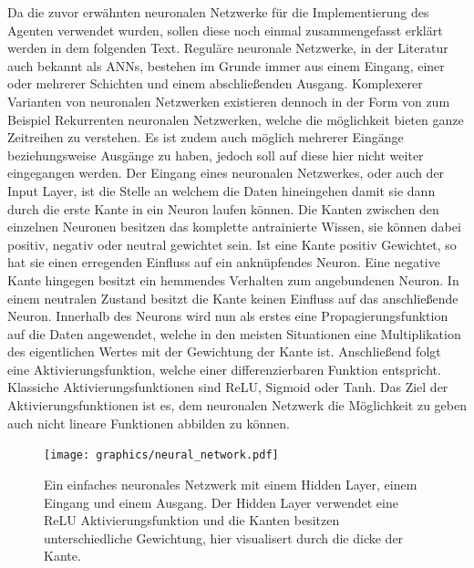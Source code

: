 \documentclass[]{iat}
\begin{document}
Da die zuvor erwähnten neuronalen Netzwerke für die Implementierung des Agenten verwendet wurden, sollen diese noch einmal zusammengefasst erklärt werden in dem folgenden Text. Reguläre neuronale Netzwerke, in der Literatur auch bekannt als ANNs, bestehen im Grunde immer aus einem Eingang, einer oder mehrerer Schichten und einem abschließenden Ausgang. Komplexerer Varianten von neuronalen Netzwerken existieren dennoch in der Form von zum Beispiel Rekurrenten neuronalen Netzwerken, welche die möglichkeit bieten ganze Zeitreihen zu verstehen. Es ist zudem auch möglich mehrerer Eingänge beziehungsweise Ausgänge zu haben, jedoch soll auf diese hier nicht weiter eingegangen werden. Der Eingang eines neuronalen Netzwerkes, oder auch der Input Layer, ist die Stelle an welchem die Daten hineingehen damit sie dann durch die erste Kante in ein Neuron laufen können. Die Kanten zwischen den einzelnen Neuronen besitzen das komplette antrainierte Wissen, sie können dabei positiv, negativ oder neutral gewichtet sein. Ist eine Kante positiv Gewichtet, so hat sie einen erregenden Einfluss auf ein anknüpfendes Neuron. Eine negative Kante hingegen besitzt ein hemmendes Verhalten zum angebundenen Neuron. In einem neutralen Zustand besitzt die Kante keinen Einfluss auf das anschließende Neuron. Innerhalb des Neurons wird nun als erstes eine Propagierungsfunktion auf die Daten angewendet, welche in den meisten Situationen eine Multiplikation des eigentlichen Wertes mit der Gewichtung der Kante ist. Anschließend folgt eine Aktivierungsfunktion, welche einer differenzierbaren Funktion entspricht. Klassiche Aktivierungsfunktionen sind ReLU, Sigmoid oder Tanh. Das Ziel der Aktivierungsfunktionen ist es, dem neuronalen Netzwerk die Möglichkeit zu geben auch nicht lineare Funktionen abbilden zu können.
\begin{figure}[H]
    \texttt{[image: graphics/neural\_network.pdf]}
    \centering
    \caption{Ein einfaches neuronales Netzwerk mit einem Hidden Layer, einem Eingang und einem Ausgang. Der Hidden Layer verwendet eine ReLU Aktivierungsfunktion und die Kanten besitzen unterschiedliche Gewichtung, hier visualisert durch die dicke der Kante.}
    \label{abb:nn}
\end{figure}
\end{document}
